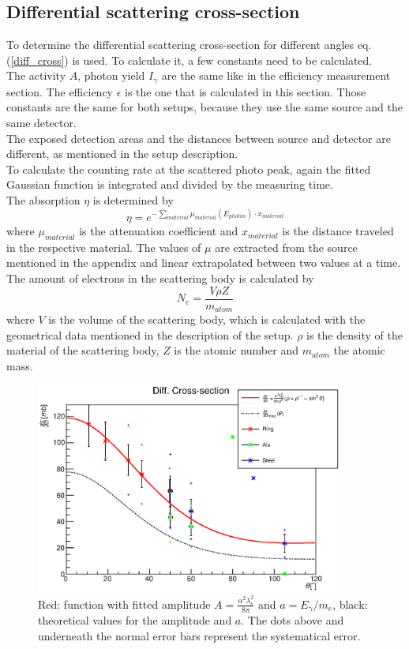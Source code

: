 \documentclass{article}
\begin{document}
\subsection{Differential scattering cross-section}
To determine the differential scattering cross-section for different angles eq.(\ref{diff_cross}) is used. To calculate it, a few constants need to be calculated.\\
The activity $A$, photon yield $I_\gamma$ are the same like in the efficiency measurement section. The efficiency $\epsilon$ is the one that is calculated in this section.
Those constants are the same for both setups, because they use the same source and the same detector.\\
The exposed detection areas and the distances between source and detector are different, as mentioned in the setup description.\\
To calculate the counting rate at the scattered photo peak, again the fitted Gaussian function is integrated and divided by the measuring time.\\
The absorption $\eta$ is determined by 
\begin{equation*}
    \eta = e^{-\sum_{material} \mu_{material}(E_{photon})\cdot x_{material}}
\end{equation*}
where $\mu_{material}$ is the attenuation coefficient and $x_{material}$ is the distance traveled in the respective material.
The values of $\mu$ are extracted from the source mentioned in the appendix and linear extrapolated between two values at a time.\\
The amount of electrons in the scattering body is calculated by
\begin{equation*}
    N_e = \frac{V\rho Z}{m_{atom}}
\end{equation*}
where $V$ is the volume of the scattering body, which is calculated with the geometrical data mentioned in the description of the setup.
$\rho$ is the density of the material of the scattering body, $Z$ is the atomic number and $m_{atom}$ the atomic mass.
\begin{figure}[H]
    \centering
    \includegraphics[width=0.9\textwidth]{Graphen/cross-section/diff_cross_Ring_Alu_Steel_.eps}
    \caption{Red: function with fitted amplitude $A = \frac{\alpha^2\lambda^2_e}{8\pi}$ and $ a = E_\gamma / m_e$, black: theoretical values for the amplitude and $a$. The dots above and underneath the normal error bars represent the systematical error.}
    \label{diff_cross_all}
\end{figure}
\end{document}
